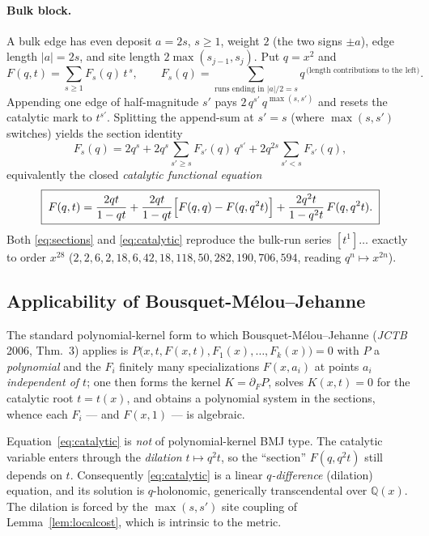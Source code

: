 \paragraph{Bulk block.}
A bulk edge has even deposit $a=2s$, $s\ge1$, weight $2$ (the two signs $\pm a$),
edge length $|a|=2s$, and site length $2\max(s_{j-1},s_j)$. Put $q=x^2$ and
\[
   F(q,t)=\sum_{s\ge1}F_s(q)\,t^{\,s},
   \qquad F_s(q)=\sum_{\text{runs ending in }|a|/2=s}
                  q^{\,\text{(length contributions to the left)}} .
\]
Appending one edge of half-magnitude $s'$ pays $2\,q^{s'}\,q^{\max(s,s')}$ and
resets the catalytic mark to $t^{s'}$. Splitting the append-sum at $s'=s$
(where $\max(s,s')$ switches) yields the section identity
\begin{equation}\label{eq:sections}
   F_s(q)=2q^{s}+2q^{s}\!\!\sum_{s'\ge s}\!F_{s'}(q)\,q^{s'}
          +2q^{2s}\!\!\sum_{s'<s}\!F_{s'}(q),
\end{equation}
equivalently the closed \emph{catalytic functional equation}
\begin{equation}\label{eq:catalytic}
   \boxed{\;
   F(q,t)=\frac{2qt}{1-qt}
          +\frac{2qt}{1-qt}\Bigl[F(q,q)-F(q,q^2t)\Bigr]
          +\frac{2q^2t}{1-q^2t}\,F(q,q^2t).
   \;}
\end{equation}
Both \eqref{eq:sections} and \eqref{eq:catalytic} reproduce the bulk-run series
$[t^1]\dots$ exactly to order $x^{28}$
($2,2,6,2,18,6,42,18,118,50,282,190,706,594$, reading $q^n\mapsto x^{2n}$).

\subsection{Applicability of Bousquet-M\'elou--Jehanne}

The standard polynomial-kernel form to which
Bousquet-M\'elou--Jehanne (\emph{JCTB} 2006, Thm.~3) applies is
$P\bigl(x,t,F(x,t),F_1(x),\dots,F_k(x)\bigr)=0$ with $P$ a \emph{polynomial} and
the $F_i$ finitely many specializations $F(x,a_i)$ at points $a_i$
\emph{independent of $t$}; one then forms the kernel
$K=\partial_F P$, solves $K(x,t)=0$ for the catalytic root $t=t(x)$, and obtains
a polynomial system in the sections, whence each $F_i$ — and $F(x,1)$ — is
algebraic.

\begin{proposition}\label{prop:nokernel}
Equation~\eqref{eq:catalytic} is \emph{not} of polynomial-kernel BMJ type. The
catalytic variable enters through the \emph{dilation} $t\mapsto q^2t$, so the
``section'' $F(q,q^2t)$ still depends on $t$. Consequently
\eqref{eq:catalytic} is a linear \emph{$q$-difference} (dilation) equation, and
its solution is $q$-holonomic, generically transcendental over $\mathbb Q(x)$.
The dilation is forced by the $\max(s,s')$ site coupling of
Lemma~\ref{lem:localcost}, which is intrinsic to the metric.
\end{proposition}

